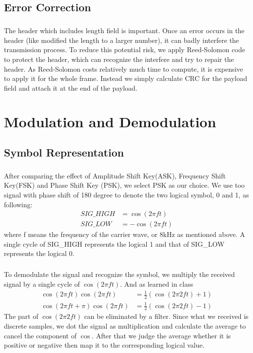 \subsection{Error Correction}
\subparagraph{}
The header which includes length field is important. Once an error occurs in the header (like modified the length to a larger number), it can badly interfere the transmission process. To reduce this potential risk, we apply Reed-Solomon code to protect the header, which can recognize the interfere and try to repair the header. As Reed-Solomon costs relatively much time to compute, it is expensive to apply it for the whole frame. Instead we simply calculate CRC for the payload field and attach it at the end of the payload.

\section{Modulation and Demodulation}
\subsection{Symbol Representation}
\subparagraph{}
After comparing the effect of Amplitude Shift Key(ASK), Frequency Shift Key(FSK) and Phase Shift Key (PSK), we select PSK as our choice. We use too signal with phase shift of 180 degree to denote the two logical symbol, 0 and 1, as following:
\[
    \begin{aligned}
        SIG\_HIGH &= \cos(2\pi ft)\\
        SIG\_LOW &= -\cos(2\pi ft)
    \end{aligned}
\]
where f means the frequency of the carrier wave, or 8kHz as mentioned above. A single cycle of SIG\_HIGH represents the logical 1 and that of SIG\_LOW represents the logical 0.
\subparagraph{}
To demodulate the signal and recognize the symbol, we multiply the received signal by a single cycle of  $\cos(2\pi ft)$. And as learned in class
\[
    \begin{aligned}
        \cos(2\pi ft) \cos(2\pi ft) &= \frac{1}{2}\left(\cos(2\pi2ft)+1\right)\\
        \cos(2\pi ft + \pi) \cos(2\pi ft) &= \frac{1}{2}\left(\cos(2\pi2ft)-1\right)
    \end{aligned}
\]
The part of $\cos(2\pi 2ft)$ can be eliminated by a filter. Since what we received is discrete samples, we dot the signal as multiplication and calculate the average to cancel the component of $\cos$. After that we judge the average whether it is positive or negative then map it to the corresponding logical value.
